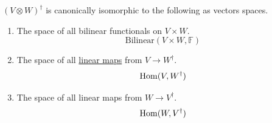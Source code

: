 	\begin{corollary}
		\label{thm:tensors_as_linear_maps}
		$(V \otimes W)^\dagger$ is canonically isomorphic to the following as vectors spaces. 
		\begin{enumerate}
		  \item The space of all bilinear functionals on $V \times W$. 
				\begin{equation}
				  \mathrm{Bilinear}(V \times W, \mathbb{F})
				\end{equation}

			\item The space of all \hyperref[def:linear_map]{linear maps} from $V \to W^\dagger$. 
				\begin{equation}
				  \operatorname{Hom}(V, W^\dagger)
				\end{equation}

			\item The space of all linear maps from $W \to V^\dagger$. 
				\begin{equation}
				  \operatorname{Hom}(W, V^\dagger)
				\end{equation}
		\end{enumerate}
	\end{corollary}

